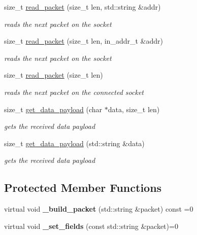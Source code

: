 \begin{CompactItemize}
size\_\-t \hyperlink{classsocketpp_1_1RawSocket_1564181b6422fb3918c419051b34ae2d}{read\_\-packet} (size\_\-t len, std::string \&addr)
\begin{CompactList}\small\item\em reads the next packet on the socket \item\end{CompactList}\item 
size\_\-t \hyperlink{classsocketpp_1_1RawSocket_08b8bec945928764f2d7ee11890b8625}{read\_\-packet} (size\_\-t len, in\_\-addr\_\-t \&addr)
\begin{CompactList}\small\item\em reads the next packet on the socket \item\end{CompactList}\item 
size\_\-t \hyperlink{classsocketpp_1_1RawSocket_ea48bec4596e2afc89adba2ccb13f6c8}{read\_\-packet} (size\_\-t len)
\begin{CompactList}\small\item\em reads the next packet on the connected socket \item\end{CompactList}\item 
size\_\-t \hyperlink{classsocketpp_1_1RawSocket_bd9631abfa5165ad4ed9e2a31640d1f0}{get\_\-data\_\-payload} (char $\ast$data, size\_\-t len)
\begin{CompactList}\small\item\em gets the received data payload \item\end{CompactList}\item 
size\_\-t \hyperlink{classsocketpp_1_1RawSocket_de47c63d60cba25d1ae82f242851610d}{get\_\-data\_\-payload} (std::string \&data)
\begin{CompactList}\small\item\em gets the received data payload \item\end{CompactList}\end{CompactItemize}
\subsection*{Protected Member Functions}
\begin{CompactItemize}
\item 
\hypertarget{classsocketpp_1_1RawSocket_9973d08473e212d99e0254520469b395}{
virtual void \textbf{\_\-build\_\-packet} (std::string \&packet) const =0}
\label{classsocketpp_1_1RawSocket_9973d08473e212d99e0254520469b395}

\item 
\hypertarget{classsocketpp_1_1RawSocket_45e6b041703cb8ae0f93dd19766865d5}{
virtual void \textbf{\_\-set\_\-fields} (const std::string \&packet)=0}
\label{classsocketpp_1_1RawSocket_45e6b041703cb8ae0f93dd19766865d5}

\end{CompactItemize}
